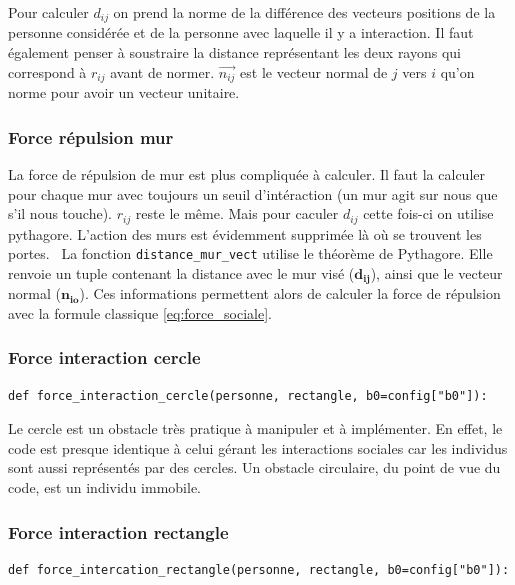 \documentclass[a4paper,12pt]{article}
\begin{document}
Pour calculer $d_{ij}$ on prend la norme de la différence des vecteurs positions de la personne considérée et de la personne avec laquelle il y a interaction. Il faut également penser à soustraire la distance représentant les deux rayons qui correspond à $r_{ij}$ avant de normer. $\vec{n_{ij}}$ est le vecteur normal de $j$ vers $i$ qu'on norme pour avoir un vecteur unitaire. 


\subsubsection{Force répulsion mur}
La force de répulsion de mur est plus compliquée à calculer. Il faut la calculer pour chaque mur avec toujours un seuil d'intéraction (un mur agit sur nous que s'il nous touche). \textbf{$r_{ij}$} reste le même. Mais pour caculer \textbf{$d_{ij}$} cette fois-ci on utilise pythagore.
L'action des murs est évidemment supprimée là où se trouvent les portes.
\
La fonction \texttt{distance\_mur\_vect} utilise le théorème de Pythagore. Elle renvoie un tuple contenant la distance avec le mur visé ($\mathbf{d_{ij}}$), ainsi que le vecteur normal ($\mathbf{n_{io}}$). Ces informations permettent alors de calculer la force de répulsion avec la formule classique \eqref{eq:force_sociale}.

\subsubsection{Force interaction cercle}
\begin{verbatim}
def force_interaction_cercle(personne, rectangle, b0=config["b0"]):
\end{verbatim}

Le cercle est un obstacle très pratique à manipuler et à implémenter. En effet, le code est presque identique à celui gérant les interactions sociales car les individus sont aussi représentés par des cercles. Un obstacle circulaire, du point de vue du code, est un individu immobile.

\subsubsection{Force interaction rectangle}

\begin{verbatim}
def force_intercation_rectangle(personne, rectangle, b0=config["b0"]):
\end{verbatim}
\end{document}
